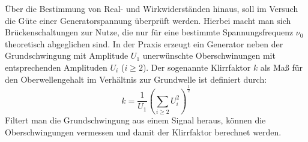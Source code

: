 Über die Bestimmung von Real- und Wirkwiderständen hinaus, soll im Versuch die Güte einer Generatorspannung überprüft werden. Hierbei
macht man sich Brückenschaltungen zur Nutze, die nur für eine bestimmte Spannungsfrequenz $\nu_0$ theoretisch abgeglichen sind. In der
Praxis erzeugt ein Generator neben der Grundschwingung mit Amplitude $U_1$ unerwünschte Oberschwinungen mit entsprechenden
Amplituden $U_i$ ($i\ge 2$). Der sogenannte Klirrfaktor $k$ als Maß für den Oberwellengehalt im Verhältnis zur Grundwelle ist definiert durch:
\begin{equation}
  k = \frac{1}{U_1} \left( \sum_{i\ge2} U_i ^2 \right) ^{\frac{1}{2}}
  \label{eq: klirr}
\end{equation}
Filtert man die Grundschwingung aus einem Signal heraus, können die Oberschwingungen vermessen und damit der Klirrfaktor berechnet werden.
